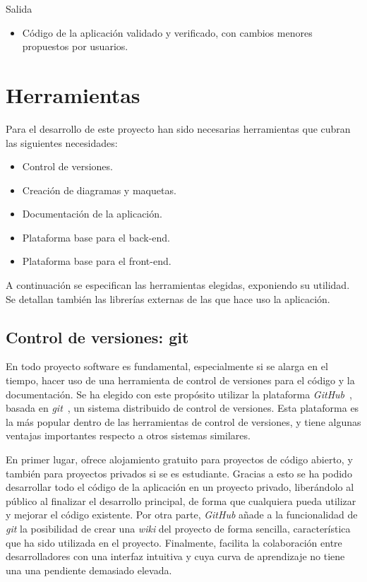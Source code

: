 Salida
\begin{itemize}[leftmargin=3.5em]
  \item Código de la aplicación validado y verificado, con cambios menores propuestos por usuarios.
\end{itemize}


\section{Herramientas\label{sec:dp:herramientas}}

Para el desarrollo de este proyecto han sido necesarias herramientas que cubran las siguientes necesidades:

\begin{itemize}
  \item Control de versiones.
  \item Creación de diagramas y maquetas.
  \item Documentación de la aplicación.
  \item Plataforma base para el \gls{back-end}.
  \item Plataforma base para el \gls{front-end}.
\end{itemize}

A continuación se especifican las herramientas elegidas, exponiendo su utilidad.
Se detallan también las librerías externas de las que hace uso la aplicación.

\subsection*{Control de versiones: git\label{ssec:dp:git}}

En todo proyecto software es fundamental, especialmente si se alarga en el tiempo, hacer uso de una herramienta de control de versiones para el código y la documentación. Se ha elegido con este propósito utilizar la plataforma \textit{GitHub}~\cite{github}, basada en \textit{git}~\cite{git}, un sistema distribuido de control de versiones.
Esta plataforma es la más popular dentro de las herramientas de control de versiones, y tiene algunas ventajas importantes respecto a otros sistemas similares.

En primer lugar, ofrece alojamiento gratuito para proyectos de código abierto, y también para proyectos privados si se es estudiante. Gracias a esto se ha podido desarrollar todo el código de la aplicación en un proyecto privado, liberándolo al público al finalizar el desarrollo principal, de forma que cualquiera pueda utilizar y mejorar el código existente. 
Por otra parte, \textit{GitHub} añade a la funcionalidad de \textit{git} la posibilidad de crear una \textit{wiki} del proyecto de forma sencilla, característica que ha sido utilizada en el proyecto.
Finalmente, facilita la colaboración entre desarrolladores con una interfaz intuitiva y cuya curva de aprendizaje no tiene una una pendiente demasiado elevada. 

